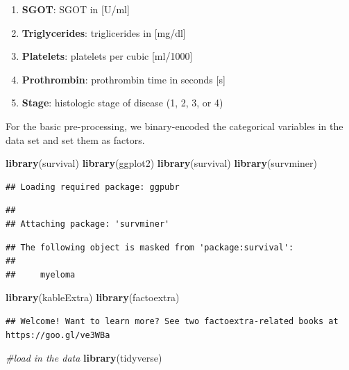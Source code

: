 \documentclass[
]{article}
\newenvironment{Shaded}{\begin{snugshade}}{\end{snugshade}}
\newcommand{\CommentTok}[1]{\textcolor[rgb]{0.56,0.35,0.01}{\textit{#1}}}
\newcommand{\FunctionTok}[1]{\textcolor[rgb]{0.13,0.29,0.53}{\textbf{#1}}}
\newcommand{\NormalTok}[1]{#1}
\begin{document}
\begin{enumerate}
\item
  \textbf{SGOT}: SGOT in {[}U/ml{]}\\
\item
  \textbf{Triglycerides}: triglicerides in {[}mg/dl{]}\\
\item
  \textbf{Platelets}: platelets per cubic {[}ml/1000{]}\\
\item
  \textbf{Prothrombin}: prothrombin time in seconds {[}s{]}\\
\item
  \textbf{Stage}: histologic stage of disease (1, 2, 3, or 4)
\end{enumerate}

For the basic pre-processing, we binary-encoded the categorical
variables in the data set and set them as factors.

\begin{Shaded}
\begin{Highlighting}[]
\FunctionTok{library}\NormalTok{(survival)}
\FunctionTok{library}\NormalTok{(ggplot2)}
\FunctionTok{library}\NormalTok{(survival)}
\FunctionTok{library}\NormalTok{(survminer)}
\end{Highlighting}
\end{Shaded}

\begin{verbatim}
## Loading required package: ggpubr
\end{verbatim}

\begin{verbatim}
## 
## Attaching package: 'survminer'
\end{verbatim}

\begin{verbatim}
## The following object is masked from 'package:survival':
## 
##     myeloma
\end{verbatim}

\begin{Shaded}
\begin{Highlighting}[]
\FunctionTok{library}\NormalTok{(kableExtra)}
\FunctionTok{library}\NormalTok{(factoextra)}
\end{Highlighting}
\end{Shaded}

\begin{verbatim}
## Welcome! Want to learn more? See two factoextra-related books at https://goo.gl/ve3WBa
\end{verbatim}

\begin{Shaded}
\begin{Highlighting}[]
\CommentTok{\#load in the data}
\FunctionTok{library}\NormalTok{(tidyverse)}
\end{Highlighting}
\end{Shaded}
\end{document}

